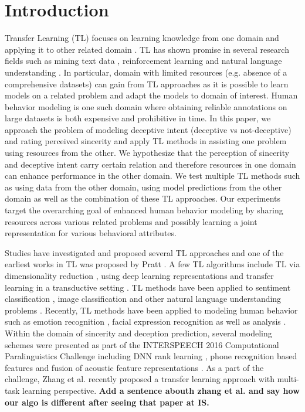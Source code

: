 \documentclass{article}
\begin{document}
\section{Introduction}
\label{sec:intro}
Transfer Learning (TL) focuses on learning knowledge from one domain and applying it to other related domain \cite{pan2010survey}. 
TL has shown promise in several research fields such as mining text data \cite{aggarwal2012mining}, reinforcement learning \cite{taylor2009transfer} and natural language understanding \cite{blitzer2007biographies}.  
In particular, domain with limited resources (e.g. absence of a comprehensive datasets) can gain from TL approaches as it is possible to learn models on a related problem and adapt the models to domain of interest. 
Human behavior modeling \cite{} is one such domain where obtaining reliable annotations on large datasets is both expensive and prohibitive in time.
In this paper, we approach the problem of modeling deceptive intent (deceptive vs not-deceptive) and rating perceived sincerity and apply TL methods in assisting one problem using resources from the other. 
We hypothesize that the perception of sincerity and deceptive intent carry certain relation and therefore resources in one domain can enhance performance in the other domain.
We test multiple TL methods such as using data from the other domain, using model predictions from the other domain as well as the combination of these TL approaches. 
Our experiments target the overarching goal of enhanced human behavior modeling by sharing resources across various related problems and possibly learning a joint representation for various behavioral attributes. 

Studies have investigated and proposed several TL approaches \cite{pan2010survey} and one of the earliest works in TL was proposed by Pratt \cite{pratt1993discriminability}.
A few TL algorithms include TL via dimensionality reduction \cite{pan2008transfer}, using deep learning representations \cite{bengio2012deep, mesnil2012unsupervised} and transfer learning in a transductive setting \cite{rohrbach2013transfer}.  
TL methods have been applied to sentiment classification \cite{blitzer2007biographies}, image classification \cite{wu2004improving} and other natural language understanding problems \cite{arnold2007comparative,blitzer2006domain}. 
Recently, TL methods have been applied to modeling human behavior such as emotion recognition \cite{zhang2016enhanced}, facial expression recognition \cite{chen2013learning} as well as analysis \cite{sangineto2014we}.
Within the domain of sincerity and deception prediction, several modeling schemes were presented as part of the INTERSPEECH 2016 Computational Paralinguistics Challenge \cite{schuller2016interspeech} including DNN rank learning \cite{gabor2016sinc}, phone recognition based features \cite{herms2016sinc} and fusion of acoustic feature representations \cite{kaya2016sinc}.  
As a part of the challenge, Zhang et al. \cite{zhang2016sinc} recently proposed a transfer learning approach with multi-task learning perspective.
{\bf Add a sentence abouth zhang et al. and say how our algo is different after seeing that paper at IS.} 
\end{document}
